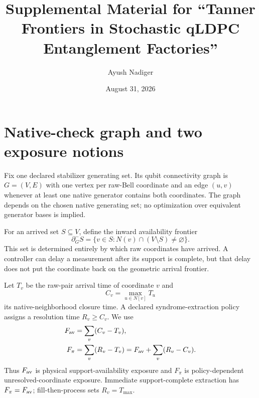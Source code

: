 \documentclass[aps,prx,preprint,superscriptaddress,nofootinbib,longbibliography]{revtex4-2}
\begin{document}
\title{Supplemental Material for ``Tanner Frontiers in Stochastic qLDPC Entanglement Factories''}
\author{Ayush Nadiger}
\date{August 31, 2026}
\maketitle

\section{Native-check graph and two exposure notions}
Fix one declared stabilizer generating set. Its qubit connectivity graph is $G=(V,E)$ with one vertex per raw-Bell coordinate and an edge $(u,v)$ whenever at least one native generator contains both coordinates. The graph depends on the chosen native generating set; no optimization over equivalent generator bases is implied.

For an arrived set $S\subseteq V$, define the inward availability frontier
\begin{equation}
\partial_G^-S=\{v\in S:N(v)\cap(V\setminus S)\neq\varnothing\}.
\end{equation}
This set is determined entirely by which raw coordinates have arrived. A controller can delay a measurement after its support is complete, but that delay does not put the coordinate back on the geometric arrival frontier.

Let $T_v$ be the raw-pair arrival time of coordinate $v$ and
\begin{equation}
C_v=\max_{u\in N[v]}T_u
\end{equation}
its native-neighborhood closure time. A declared syndrome-extraction policy assigns a resolution time $R_v\ge C_v$. We use
\begin{align}
F_{\rm av}&=\sum_v(C_v-T_v),\\
F_\pi&=\sum_v(R_v-T_v)
      =F_{\rm av}+\sum_v(R_v-C_v).
\end{align}
Thus $F_{\rm av}$ is physical support-availability exposure and $F_\pi$ is policy-dependent unresolved-coordinate exposure. Immediate support-complete extraction has $F_\pi=F_{\rm av}$; fill-then-process sets $R_v=T_{\max}$.
\end{document}
